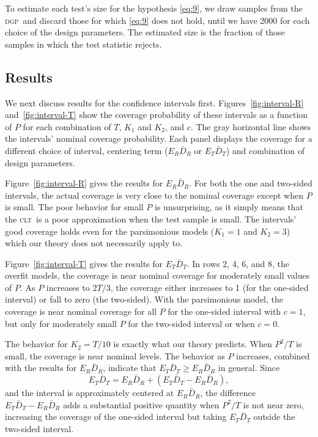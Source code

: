 \documentclass[11pt]{article}
\newcommand{\oosA}{\bar{D}_{R}}
\newcommand{\oosB}{\bar{D}_{T}}
\newcommand{\clt}{\textsc{clt}}
\newcommand{\dgp}{\textsc{dgp}}
\begin{document}
To estimate each test's size for the hypothesis \eqref{eq:9}, we draw
samples from the \dgp\ and discard those for which \eqref{eq:9} does
not hold, until we have 2000 for each choice of the design parameters.
The estimated size is the fraction of those samples in which the test
statistic rejects.
\subsection{Results}
We next discuss results for the confidence intervals first.
Figures~\ref{fig:interval-R} and~\ref{fig:interval-T} show the
coverage probability of these intervals as a function of $P$ for each
combination of $T$, $K_1$ and $K_2$, and $c$.  The gray horizontal
line shows the intervals' nominal coverage probability.  Each panel
displays the coverage for a different choice of interval, centering
term ($E_R \oosA$ or $E_T \oosB$) and combination of design
parameters.

Figure~\ref{fig:interval-R} gives the results for $E_R \oosA$.  For
both the one and two-sided intervals, the actual coverage is very
close to the nominal coverage except when $P$ is small.  The poor
behavior for small $P$ is unsurprising, as it simply means that the
\clt\ is a poor approximation when the test sample is small.  The
intervals' good coverage holds even for the parsimonious models
($K_1=1$ and $K_2= 3$) which our theory does not necessarily apply to.

Figure~\ref{fig:interval-T} gives the results for $E_T \oosB$.  In
rows 2, 4, 6, and 8, the overfit models, the coverage is near nominal
coverage for moderately small values of $P$.  As $P$ increases to $2T/3$, the
coverage either increases to 1 (for the one-sided interval) or fall to
zero (the two-sided).  With the parsimonious model, the coverage is near
nominal coverage for all $P$ for the one-sided interval with $c=1$,
but only for moderately small $P$ for the two-sided interval or when
$c=0$.

The behavior for $K_2 = T/10$ is exactly what our theory predicts.
When $P^2/T$ is small, the coverage is near nominal levels.  The
behavior as $P$ increases, combined with the results for $E_R
\oosA$, indicate that $E_T \oosB \geq E_R \oosA$ in general.
Since
\[E_{T} \oosB = E_{R} \oosA + (E_{T} \oosB - E_{R} \oosA), \] and the
interval is approximately centered at $E_R \oosA$, the difference
$E_{T} \oosB - E_{R} \oosA$ adds a substantial positive quantity when
$P^2/T$ is not near zero, increasing the coverage of the one-sided
interval but taking $E_T \oosB$ outside the two-sided interval.
\end{document}
